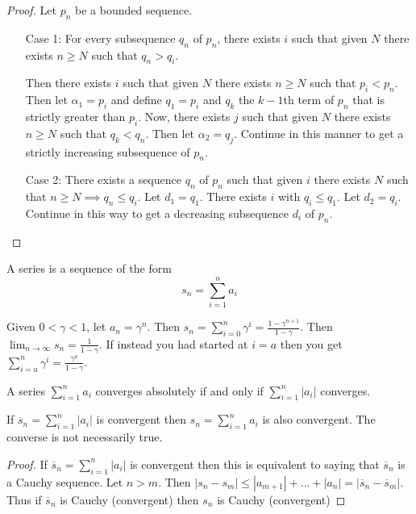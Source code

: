 \documentclass{article}
\newcommand{\ra}[1][]{\xrightarrow{#1}}
\begin{document}
\begin{proof}
    Let $p_n$ be a bounded sequence.
\begin{enumerate}
    \item[Case 1:]  For every subsequence $q_n$ of $p_n$, there exists $i$ such that given $N$ there exists $n\geq N$ such that $q_n>q_i$.

    Then there exists $i$ such that given $N$ there exists $n\geq N$ such that $p_i<p_n$. Then let $\alpha_1=p_i$ and define $q_1=p_i$ and $q_k$ the $k-1$th term of $p_n$ that is strictly greater than $p_i$. Now, there exists $j$ such that given $N$ there exists $n\geq N$ such that $q_k<q_n$. Then let $\alpha_2=q_j$. Continue in this manner to get a strictly increasing subsequence of $p_n$.
    \item[Case 2:] There exists a sequence $q_n$ of $p_n$ such that given $i$ there exists $N$ such that $n\geq N\implies q_n\leq q_i$.
    Let $d_1=q_1$. There exists $i$ with $q_i\leq q_1$. Let $d_2=q_i$. Continue in this way to get a decreasing subsequence $d_i$ of $p_n$.

\end{enumerate}
\end{proof}
\begin{definition}
A series is a sequence of the form $$s_n=\sum_{i=1}^n{a_i}$$
\end{definition}
\begin{definition}
Given $0<\gamma<1$, let $a_n=\gamma^n$. Then $s_n=\sum_{i=0}^n\gamma^i=\frac{1-\gamma^{n+1}}{1-\gamma}$. Then $\lim_{n\ra\infty}s_n=\frac{1}{1-\gamma}$. If instead you had started at $i=a$ then you get $\sum_{i=a}^n\gamma^i=\frac{\gamma^a}{1-\gamma}$.
\end{definition}
\begin{definition}
A series $\sum_{i=1}^n a_i$ converges absolutely if and only if $\sum_{i=1}^n|a_i|$ converges.
\end{definition}
\begin{proposition}
If $\overline{s}_n=\sum_{i=1}^n|a_i|$ is convergent then $s_n=\sum_{i=1}^n a_i$ is also convergent. The converse is not necessarily true.
\end{proposition}
\begin{proof}
If $\overline{s}_n=\sum_{i=1}^n|a_i|$ is convergent then this is equivalent to saying that $\overline{s}_n$ is a Cauchy sequence. Let $n>m$. Then $|s_n-s_m|\leq|a_{m+1}|+...+|a_n|=|\overline{s}_n-\overline{s}_m|$. Thus if $\overline{s}_n$ is Cauchy (convergent) then $s_n$ is Cauchy (convergent)
\end{proof}
\end{document}

